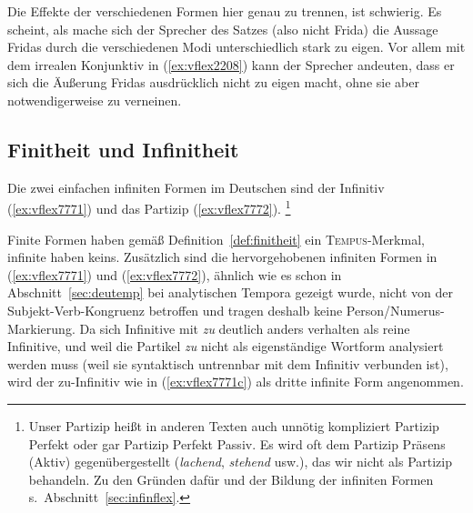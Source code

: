 Die Effekte der verschiedenen Formen hier genau zu trennen, ist schwierig.
Es scheint, als mache sich der Sprecher des Satzes (also nicht Frida) die Aussage Fridas durch die verschiedenen Modi unterschiedlich stark zu eigen.
Vor allem mit dem irrealen Konjunktiv in (\ref{ex:vflex2208}) kann der Sprecher andeuten, dass er sich die Äußerung Fridas ausdrücklich nicht zu eigen macht, ohne sie aber notwendigerweise zu verneinen.

\subsection{Finitheit und Infinitheit}

\label{sec:finit}


Die zwei einfachen infiniten Formen im Deutschen sind der Infinitiv (\ref{ex:vflex7771}) und das Partizip (\ref{ex:vflex7772}).%
\footnote{Unser Partizip heißt in anderen Texten auch unnötig kompliziert Partizip Perfekt oder gar Partizip Perfekt Passiv.
Es wird oft dem Partizip Präsens (Aktiv) gegenübergestellt (\textit{lachend}, \textit{stehend} usw.), das wir nicht als Partizip behandeln.
Zu den Gründen dafür und der Bildung der infiniten Formen s.\ Abschnitt~\ref{sec:infinflex}.}


Finite Formen haben gemäß Definition~\ref{def:finitheit} ein \textsc{Tempus}-Merkmal, infinite haben keins.
Zusätzlich sind die hervorgehobenen infiniten Formen in (\ref{ex:vflex7771}) und (\ref{ex:vflex7772}), ähnlich wie es schon in Abschnitt~\ref{sec:deutemp} bei analytischen Tempora gezeigt wurde, nicht von der Subjekt-Verb-Kongruenz betroffen und tragen deshalb keine Person\slash Numerus-Markierung.
Da sich Infinitive mit \textit{zu} deutlich anders verhalten als reine Infinitive, und weil die Partikel \textit{zu} nicht als eigenständige Wortform analysiert werden muss (weil sie syntaktisch untrennbar mit dem Infinitiv verbunden ist), wird der zu-Infinitiv wie in (\ref{ex:vflex7771c}) als dritte infinite Form angenommen.

\begin{exe}
  \ex\label{ex:vflex7771}
  \begin{xlist}
  \end{xlist}
  \ex\label{ex:vflex7772}
  \begin{xlist}
  \end{xlist}
\end{exe}

